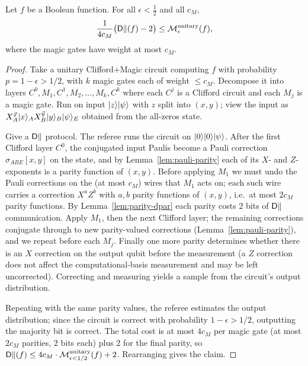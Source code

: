 \begin{theorem}
  \label{thm:dpar-unitary}
  Let $f$ be a Boolean function. For all $\epsilon < \tfrac12$ and all $c_M$,
  \[
    \frac{1}{4 c_M}\big(\mathsf{D}\|(f) - 2\big) \le \mathcal{M}^{\mathrm{unitary}}_{\epsilon}(f),
  \]
  where the magic gates have weight at most $c_M$.
\end{theorem}
\begin{proof}
  Take a unitary Clifford$+$Magic circuit computing $f$ with probability
  $p = 1-\epsilon > 1/2$, with $k$ magic gates each of weight $\le c_M$.
  Decompose it into layers $C^0, M_1, C^1, M_2, \dots, M_k, C^k$ where each $C^j$
  is a Clifford circuit and each $M_j$ is a magic gate. Run on input
  $\lvert z\rangle\lvert \psi\rangle$ with $z$ split into $(x,y)$; view the input as
  $X_A^{\vec x}\lvert x\rangle_A X_B^{\vec y}\lvert y\rangle_B\lvert \psi\rangle_E$ obtained from the
  all-zeros state.

  Give a $\mathsf{D}\|$ protocol. The referee runs the circuit on
  $\lvert 0\rangle\lvert 0\rangle\lvert \psi\rangle$. After the first Clifford layer $C^0$, the conjugated
  input Paulis become a Pauli correction $\sigma_{ABE}[x,y]$ on the state, and by
  Lemma~\ref{lem:pauli-parity} each of its $X$- and $Z$-exponents is a parity
  function of $(x,y)$. Before applying $M_1$ we must undo the Pauli corrections on
  the (at most $c_M$) wires that $M_1$ acts on; each such wire carries a
  correction $X^a Z^b$ with $a,b$ parity functions of $(x,y)$, i.e.\ at most
  $2c_M$ parity functions. By Lemma~\ref{lem:parity-dpar} each parity costs $2$
  bits of $\mathsf{D}\|$ communication. Apply $M_1$, then the next Clifford layer; the
  remaining corrections conjugate through to new parity-valued corrections
  (Lemma~\ref{lem:pauli-parity}), and we repeat before each $M_j$. Finally one
  more parity determines whether there is an $X$ correction on the output qubit
  before the measurement (a $Z$ correction does not affect the computational-basis
  measurement and may be left uncorrected). Correcting and measuring yields a
  sample from the circuit's output distribution.

  Repeating with the same parity values, the referee estimates the output
  distribution; since the circuit is correct with probability $1-\epsilon > 1/2$,
  outputting the majority bit is correct. The total cost is at most $4c_M$ per
  magic gate (at most $2c_M$ parities, $2$ bits each) plus $2$ for the final
  parity, so $\mathsf{D}\|(f) \le 4c_M\cdot \mathcal{M}^{\mathrm{unitary}}_{\epsilon<1/2}(f) + 2$. Rearranging gives
  the claim.
\end{proof}

